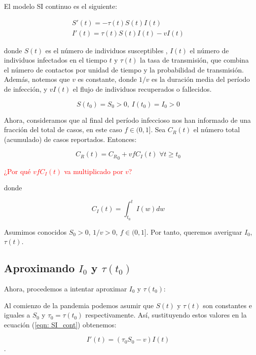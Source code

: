 El modelo SI continuo es el siguiente:

\begin{equation}
\label{eqn: SI_cont}
\begin{aligned}
S'(t) = -\tau (t)S(t)I(t) \\
I'(t) = \tau (t)S(t)I(t) -vI(t)
\end{aligned}
\end{equation}

donde $S(t)$ es el número de individuos susceptibles , $I(t)$ el número de individuos infectados en el tiempo $t$ y $\tau (t)$ la tasa de transmisión, que combina el número de contactos por unidad de tiempo y la probabilidad de transmisión. Además, notemos que $v$ es constante, donde $1/v$ es la duración media del período de infección, y $vI(t)$ el flujo de individuos recuperados o fallecidos. %

$$S(t_0)=S_0>0, \: I(t_0)=I_0>0$$

Ahora, consideramos que al final del período infeccioso nos han informado de una fracción del total de casos, en este caso $f\in (0,1]$. Sea $C_R(t)$ el número total (acumulado) de casos reportados. Entonces:

\begin{equation}
\label{eqn: acumulada}
C_R(t) = {C_R}_0 + vfC_I(t) \; \forall t \geq t_0
\end{equation}

\textcolor{red}{¿Por qué $vfC_I(t)$ va multiplicado por $v$?}

donde

$$C_I(t) = \int_{t_0}^t I(w) dw $$

Asumimos conocidos $S_0 > 0$, $1/v>0$, $f\in (0,1]$. Por tanto, queremos averiguar $I_0$, $\tau (t)$.

\subsection{Aproximando $I_0$ y $\tau (t_0)$}
Ahora, procedemos a intentar aproximar $I_0$ y $\tau (t_0)$:

Al comienzo de la pandemia podemos asumir que $S(t)$ y $\tau (t)$ son constantes e iguales a $S_0$ y $\tau_0 = \tau (t_0)$ respectivamente. Así, sustituyendo estos valores en la ecuación (\ref{eqn: SI_cont}) obtenemos:

$$I'(t) = (\tau_0 S_0 -v) I(t)$$.

